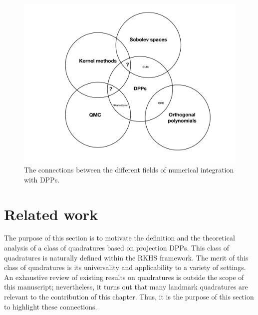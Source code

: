\documentclass[twoside,11pt]{book}
\numberwithin{theorem}{chapter}
\numberwithin{definition}{chapter}
\numberwithin{proposition}{chapter}
\numberwithin{corollary}{chapter}
\numberwithin{example}{chapter}
\numberwithin{lemma}{chapter}
\numberwithin{assumption}{chapter}
\numberwithin{equation}{chapter}
\numberwithin{figure}{chapter}
\begin{document}
 

\begin{figure}[]
    \centering
\includegraphics[width= 1\textwidth]{img/big_picture_opt}
\caption{The connections between the different fields of numerical integration with DPPs.
\label{fig:big_picture_kqdpp}}
\end{figure}

\section{Related work}\label{sec:related_work_quadratures}
The purpose of this section is to motivate the definition and the theoretical analysis of a class of quadratures based on projection DPPs. This class of quadratures is naturally defined within the RKHS framework. The merit of this class of quadratures is its universality and applicability to a variety of settings. An exhaustive review of existing results on quadratures is outside the scope of this manuscript; nevertheless, it turns out that many landmark quadratures are relevant to the contribution of this chapter. 
Thus, it is the purpose of this section to highlight these connections.





\end{document}
